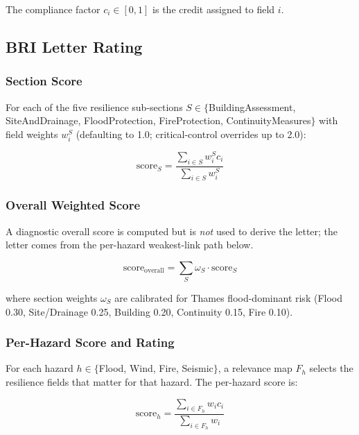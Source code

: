 \documentclass[11pt,a4paper]{article}
\begin{document}
\noindent The compliance factor $c_i \in [0, 1]$ is the credit assigned to field $i$.

\subsection{BRI Letter Rating}
\label{sec:letter_rating}

\subsubsection{Section Score}
For each of the five resilience sub-sections $S \in \{$BuildingAssessment,
SiteAndDrainage, FloodProtection, FireProtection, ContinuityMeasures$\}$ with field
weights $w_i^S$ (defaulting to 1.0; critical-control overrides up to 2.0):

\begin{equation}
    \text{score}_S = \frac{\sum_{i \in S} w_i^S c_i}{\sum_{i \in S} w_i^S}
\end{equation}

\subsubsection{Overall Weighted Score}
A diagnostic overall score is computed but is \emph{not} used to derive the letter;
the letter comes from the per-hazard weakest-link path below.

\begin{equation}
    \text{score}_{\text{overall}} = \sum_S \omega_S \cdot \text{score}_S
\end{equation}

\noindent where section weights $\omega_S$ are calibrated for Thames flood-dominant risk
(Flood 0.30, Site/Drainage 0.25, Building 0.20, Continuity 0.15, Fire 0.10).

\subsubsection{Per-Hazard Score and Rating}
For each hazard $h \in \{$Flood, Wind, Fire, Seismic$\}$, a relevance map
$F_h$ selects the resilience fields that matter for that hazard. The per-hazard score is:

\begin{equation}
    \text{score}_h = \frac{\sum_{i \in F_h} w_i c_i}{\sum_{i \in F_h} w_i}
\end{equation}
\end{document}
